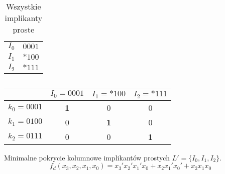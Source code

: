 \begin{table}[H]
    \centering
    \begin{tabular}[t]{ |c|c| }
        \hline
        $I_0$ & $0001$ \\
        $I_1$ & ${*}100$ \\
        $I_2$ & ${*}111$ \\
        \hline
    \end{tabular}
    \caption{Wszystkie implikanty proste} \label{tab:all-implicantsd}
\end{table}

\begin{table}[H]
    \centering
    \begin{tabular}[t]{ |c||c|c|c| }
        \hline
        & $I_0 = 0001$ & $I_1 = {*}100$ & $I_2 = {*}111$ \\
        \hline
        \hline
        $k_0 = 0001$ & \textbf{1} & 0 & 0 \\
        \hline
        $k_1 = 0100$ & 0 & \textbf{1} &  0 \\
        \hline
        $k_2 = 0111$ & 0 & 0 & \textbf{1} \\
        \hline
    \end{tabular}
    \caption{} \label{tab:min-blockd}
\end{table}
Minimalne pokrycie kolumnowe implikantów prostych $L' = \{I_0, I_1, I_2\}$.
\begin{equation}
    \label{eq:fd}
f_d(x_3, x_2, x_1, x_0) = x_3'x_2'x_1'x_0 + x_{2}x_1'x_0' + x_{2}x_{1}x_{0}
\end{equation}